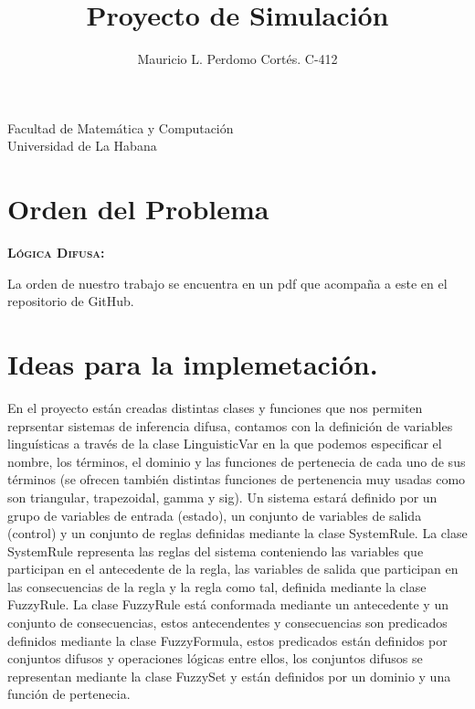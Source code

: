\documentclass[12pt]{article}
\title{Proyecto de Simulaci\'on}
\author{Mauricio L. Perdomo Cort\'es. C-412}
\begin{document}
\vspace{8.cm}

\maketitle

\begin{center}
    Facultad de Matem\'atica y Computaci\'on\\\vspace{0.2cm} Universidad de La Habana
\end{center}

\clearpage

\newpage

\section{Orden del Problema}
\textsc{\textbf{L\'ogica Difusa:}}

La orden de nuestro trabajo se encuentra en un pdf que acompa\~na a este en el repositorio de GitHub.

\section{Ideas para la implemetaci\'on.}
En el proyecto est\'an creadas distintas clases y funciones que nos permiten reprsentar sistemas de inferencia difusa, contamos
con la definici\'on de variables lingu\'isticas a trav\'es de la clase LinguisticVar en la que podemos especificar el nombre, los t\'erminos, el dominio y 
las funciones de pertenecia de cada uno de sus t\'erminos (se ofrecen tambi\'en distintas funciones de pertenencia muy usadas como son triangular, trapezoidal, gamma y sig). 
Un sistema estar\'a definido por un grupo de variables de entrada (estado), un conjunto de variables de salida (control) y un conjunto de reglas definidas mediante la clase
SystemRule. La clase SystemRule representa las reglas del sistema conteniendo las variables que participan en el antecedente de la regla, las variables de salida que participan en las 
consecuencias de la regla y la regla como tal, definida mediante la clase FuzzyRule. La clase FuzzyRule est\'a conformada mediante un antecedente y un conjunto de consecuencias, estos antecendentes y consecuencias
son predicados definidos mediante la clase FuzzyFormula, estos predicados est\'an definidos por conjuntos difusos y operaciones l\'ogicas entre ellos, los conjuntos difusos se representan mediante la clase FuzzySet y est\'an definidos por un 
dominio y una funci\'on de pertenecia.
\end{document}
